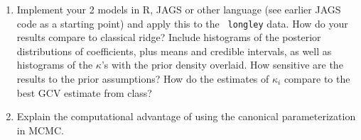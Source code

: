 \documentclass{article}
\begin{document}
\begin{enumerate}
\item Implement your 2 models in R, JAGS or other language (see
  earlier JAGS code as a starting point) and apply this to the {\tt
    longley} data.  How do your results compare to classical ridge?
  Include histograms of the posterior distributions of coefficients,
  plus means and credible intervals, as well as histograms of the
  $\kappa$'s with the prior density overlaid.  How sensitive are the
  results to the prior assumptions?  How do the estimates of
  $\kappa_i$ compare to the best GCV estimate from class?

\item Explain the computational advantage of using the canonical
  parameterization in MCMC.
\end{enumerate}
\end{document}
